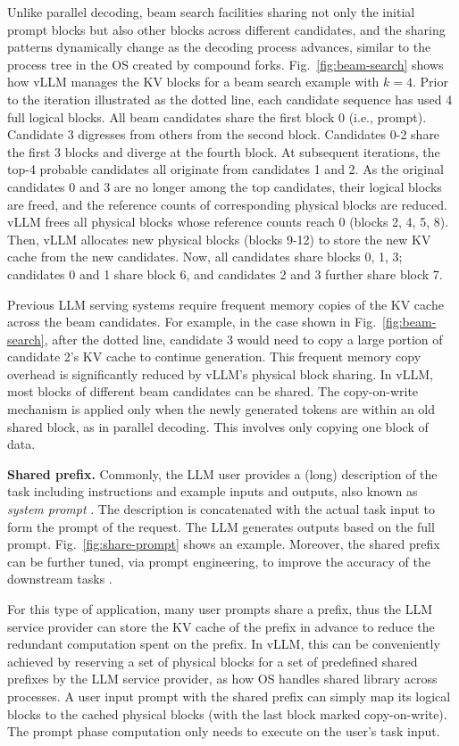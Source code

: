 Unlike parallel decoding, beam search facilities sharing not only the initial prompt blocks but also other blocks across different candidates, and the sharing patterns dynamically change as the decoding process advances, similar to the process tree in the OS created by compound forks. 
Fig.~\ref{fig:beam-search} shows how vLLM manages the KV blocks for a beam search example with $k = 4$. Prior to the iteration illustrated as the dotted line, each candidate sequence has used 4 full logical blocks. All beam candidates share the first block 0 (i.e., prompt). Candidate 3 digresses from others from the second block. Candidates 0-2 share the first 3 blocks and diverge at the fourth block. At subsequent iterations, the top-4 probable candidates all originate from candidates 1 and 2. As the original candidates 0 and 3 are no longer among the top candidates, their logical blocks are freed, and the reference counts of corresponding physical blocks are reduced. vLLM frees all physical blocks whose reference counts reach 0 (blocks 2, 4, 5, 8). Then, vLLM allocates new physical blocks (blocks 9-12) to store the new KV cache from the new candidates. Now, all candidates share blocks 0, 1, 3; candidates 0 and 1 share block 6, and candidates 2 and 3 further share block 7.

Previous LLM serving systems require frequent memory copies of the KV cache across the beam candidates. For example, in the case shown in Fig.~\ref{fig:beam-search}, after the dotted line, candidate 3 would need to copy a large portion of candidate 2's KV cache to continue generation. This frequent memory copy overhead is significantly reduced by vLLM's physical block sharing. In vLLM, most blocks of different beam candidates can be shared. The copy-on-write mechanism is applied only when the newly generated tokens are within an old shared block, as in parallel decoding.  This involves only copying one block of data.

\textbf{Shared prefix.} Commonly, the LLM user provides a (long) description of the task including instructions and example inputs and outputs, also known as \emph{system prompt} \cite{chatgptuserprompt}. The description is concatenated with the actual task input to form the prompt of the request. The LLM generates outputs based on the full prompt. Fig.~\ref{fig:share-prompt} shows an example. Moreover, the shared prefix can be further tuned, via prompt engineering, to improve the accuracy of the downstream tasks \cite{li2021prefix, lester2021power}.

For this type of application, many user prompts share a prefix, thus the LLM service provider can store the KV cache of the prefix in advance to reduce the redundant computation spent on the prefix. In vLLM, this can be conveniently achieved by reserving a set of physical blocks for a set of predefined shared prefixes by the LLM service provider, as how OS handles shared library across processes. A user input prompt with the shared prefix can simply map its logical blocks to the cached physical blocks (with the last block marked copy-on-write). The prompt phase computation only needs to execute on the user's task input.

